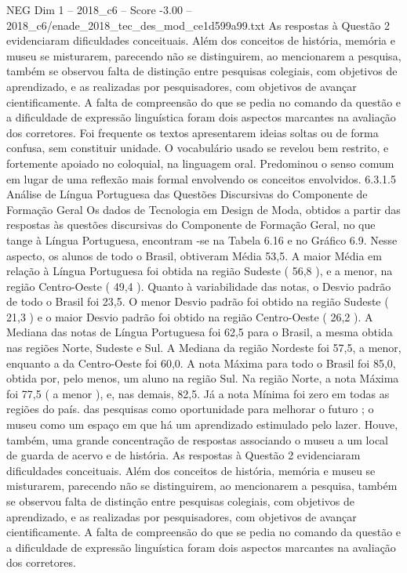 \begin{textsample}{NEG Dim 1 – 2018\_c6 – Score -3.00 – 2018\_c6/enade\_2018\_tec\_des\_mod\_ce1d599a99.txt}
As respostas à Questão 2 evidenciaram dificuldades conceituais.
Além dos conceitos de história, memória e museu se misturarem, parecendo não se distinguirem, ao mencionarem a pesquisa, também se observou falta de distinção entre pesquisas colegiais, com objetivos de aprendizado, e as realizadas por pesquisadores, com objetivos de avançar cientificamente.
A falta de compreensão do que se pedia no comando da questão e a dificuldade de expressão linguística foram dois aspectos marcantes na avaliação dos corretores.
Foi frequente os textos apresentarem ideias soltas ou de forma confusa, sem constituir unidade.
O vocabulário usado se revelou bem restrito, e fortemente apoiado no coloquial, na linguagem oral.
Predominou o senso comum em lugar de uma reflexão mais formal envolvendo os conceitos envolvidos. 6.3.1.5 Análise de Língua Portuguesa das Questões Discursivas do Componente de Formação Geral Os dados de Tecnologia em Design de Moda, obtidos a partir das respostas às questões discursivas do Componente de Formação Geral, no que tange à Língua Portuguesa, encontram -se na Tabela 6.16 e no Gráfico 6.9.
Nesse aspecto, os alunos de todo o Brasil, obtiveram Média 53,5.
A maior Média em relação à Língua Portuguesa foi obtida na região Sudeste ( 56,8 ), e a menor, na região Centro-Oeste ( 49,4 ).
Quanto à variabilidade das notas, o Desvio padrão de todo o Brasil foi 23,5.
O menor Desvio padrão foi obtido na região Sudeste ( 21,3 ) e o maior Desvio padrão foi obtido na região Centro-Oeste ( 26,2 ).
A Mediana das notas de Língua Portuguesa foi 62,5 para o Brasil, a mesma obtida nas regiões Norte, Sudeste e Sul.
A Mediana da região Nordeste foi 57,5, a menor, enquanto a da Centro-Oeste foi 60,0.
A nota Máxima para todo o Brasil foi 85,0, obtida por, pelo menos, um aluno na região Sul.
Na região Norte, a nota Máxima foi 77,5 ( a menor ), e, nas demais, 82,5.
Já a nota Mínima foi zero em todas as regiões do país. das pesquisas como oportunidade para melhorar o futuro ; o museu como um espaço em que há um aprendizado estimulado pelo lazer.
Houve, também, uma grande concentração de respostas associando o museu a um local de guarda de acervo e de história.
As respostas à Questão 2 evidenciaram dificuldades conceituais.
Além dos conceitos de história, memória e museu se misturarem, parecendo não se distinguirem, ao mencionarem a pesquisa, também se observou falta de distinção entre pesquisas colegiais, com objetivos de aprendizado, e as realizadas por pesquisadores, com objetivos de avançar cientificamente.
A falta de compreensão do que se pedia no comando da questão e a dificuldade de expressão linguística foram dois aspectos marcantes na avaliação dos corretores.

\end{textsample}

